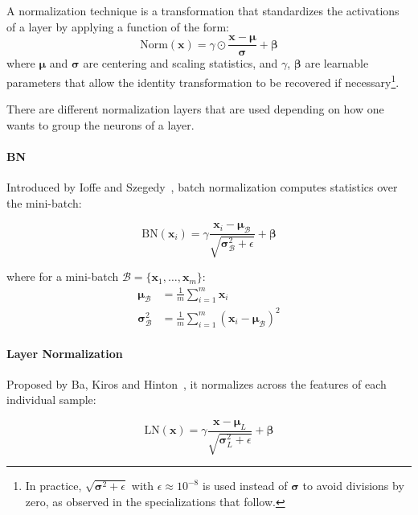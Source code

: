 \begin{definition}\label{def:normalizacion}
	A normalization technique is a transformation that standardizes the activations of a layer by applying a function of the form:
	\[
	\text{Norm}(\mathbf{x}) = \gamma \odot \frac{\mathbf{x} - \boldsymbol{\mu}}{\boldsymbol{\sigma}} + \boldsymbol{\beta}
	\]
	where $\boldsymbol{\mu}$ and $\boldsymbol{\sigma}$ are centering and scaling statistics, and $\gamma$, $\boldsymbol{\beta}$ are learnable parameters that allow the identity transformation to be recovered if necessary\footnote{In practice, $\sqrt{\boldsymbol{\sigma}^2 + \epsilon}$ with $\epsilon \approx 10^{-8}$ is used instead of $\boldsymbol{\sigma}$ to avoid divisions by zero, as observed in the specializations that follow.}.
\end{definition}

There are different normalization layers that are used depending on how one wants to group the neurons of a layer.

\paragraph{\gls{BN}}

Introduced by Ioffe and Szegedy~\citep{ioffe2015batch}, batch normalization computes statistics over the mini-batch:

\[
\text{BN}(\mathbf{x}_i) = \gamma \frac{\mathbf{x}_i - \boldsymbol{\mu}_{\mathcal{B}}}{\sqrt{\boldsymbol{\sigma}^2_{\mathcal{B}} + \epsilon}} + \boldsymbol{\beta}
\]

where for a mini-batch $\mathcal{B} = \{\mathbf{x}_1, \ldots, \mathbf{x}_m\}$:
\begin{align}
\boldsymbol{\mu}_{\mathcal{B}} &= \frac{1}{m} \sum_{i=1}^m \mathbf{x}_i \\
\boldsymbol{\sigma}^2_{\mathcal{B}} &= \frac{1}{m} \sum_{i=1}^m (\mathbf{x}_i - \boldsymbol{\mu}_{\mathcal{B}})^2
\end{align}

\paragraph{Layer Normalization}

Proposed by Ba, Kiros and Hinton~\citep{ba2016layer}, it normalizes across the features of each individual sample:

\[
\text{LN}(\mathbf{x}) = \gamma \frac{\mathbf{x} - \boldsymbol{\mu}_L}{\sqrt{\boldsymbol{\sigma}^2_L + \epsilon}} + \boldsymbol{\beta}
\]

